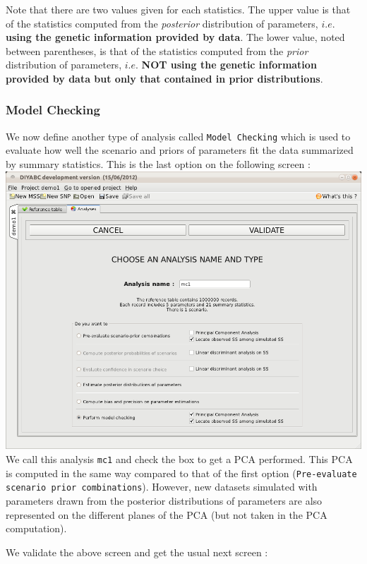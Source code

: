 Note that there are two values given for each statistics. The upper value is that of the statistics computed from the \emph{posterior} distribution of parameters, $i.e.$ \textbf{using the genetic information provided by data}. The lower value, noted between parentheses, is that of the statistics computed from the \emph{prior} distribution of parameters, $i.e.$ \textbf{NOT using the genetic information provided by data but only that contained in prior distributions}.  

\subsubsection{Model Checking}
We now define another type of analysis called \texttt{Model Checking} which is used to evaluate how well the scenario and priors of parameters fit the data summarized by summary statistics. This is the last option on the following screen :\\

\includegraphics[scale=0.32]{gui_pictures/Capture-DIYABC-53.png} \\

We call this analysis \texttt{mc1} and check the box to get a PCA performed. This PCA is computed in the same way compared to that of the first option (\texttt{Pre-evaluate scenario prior combinations}). However, new datasets simulated with parameters drawn from the posterior distributions of parameters are also represented on the different planes of the PCA (but not taken in the PCA  computation). 

We validate the above screen and get the usual next screen :\\

